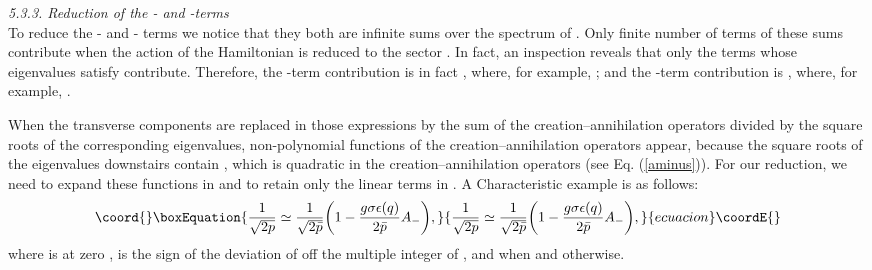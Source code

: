\documentclass[a4paper,12pt]{article}
\begin{document}
{\it 5.3.3. Reduction of the \coordHE{}- and \coordHE{}-terms }\\

To reduce the \coordHE{}- and \coordHE{}- terms we notice that they both are 
infinite sums over the spectrum of \coordHE{}. Only finite number 
of terms of these sums contribute 
when the action of the Hamiltonian is reduced to the sector 
\coordHE{}. In fact, 
an inspection reveals that only the terms whose eigenvalues \coordHE{} satisfy 
\coordHE{} contribute. Therefore, the \coordHE{}-term contribution is in fact
\coordHE{}, where, for example, \coordHE{}; 
and the \coordHE{}-term contribution is 
\coordHE{}, where, for 
example, \coordHE{}.

When the transverse components \coordHE{} are replaced in those expressions 
by the sum of the creation--annihilation operators divided by 
the square roots of the corresponding eigenvalues, 
non-polynomial functions of the creation--annihilation 
operators appear, because the square roots of the eigenvalues 
downstairs contain \coordHE{}, which is quadratic in 
the creation--annihilation operators (see Eq. 
(\ref{aminus})). For our reduction, we need to expand these 
functions in \coordHE{} and to retain only the linear terms in \coordHE{}. 
A Characteristic example is as follows:
\begin{equation}\coord{}\boxEquation{
\label{example}
\frac{1}{\sqrt{2p}} \simeq \frac{1}{\sqrt{2\bar{p}}}
\bigg( 1 -
\frac{g\sigma\epsilon(q)}{2\bar{p}}A_- \bigg),
}{
\frac{1}{\sqrt{2p}} \simeq \frac{1}{\sqrt{2\bar{p}}}
\bigg( 1 -
\frac{g\sigma\epsilon(q)}{2\bar{p}}A_- \bigg),
}{ecuacion}\coordE{}\end{equation}
where \coordHE{} is \coordHE{} at zero \coordHE{}, \myHighlight{$\sigma$}\coordHE{} is the sign 
of the deviation of \coordHE{} off the multiple integer of \coordHE{}, 
and \coordHE{} when \coordHE{} and \coordHE{} otherwise. 
\end{document}
